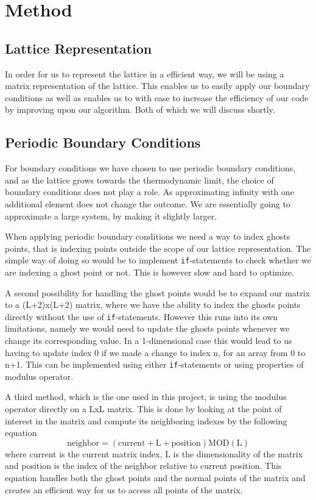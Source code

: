 \documentclass[%
reprint,
nofootinbib,
amsmath,amssymb,
aps,
]{revtex4-1}
\begin{document}
\section{Method}
\subsection{Lattice Representation} %
In order for us to represent the lattice in a efficient way, we will be using a matrix representation of the lattice. This enables us to easily apply our boundary conditions as well as enables us to with ease to increase the efficiency of our code by improving upon our algorithm. Both of which we will discuss shortly. 
\subsection{Periodic Boundary Conditions} %
For boundary conditions we have chosen to use periodic boundary conditions, and as the lattice grows towards the thermodynamic limit, the choice of boundary conditions does not play a role. As approximating infinity with one additional element does not change the outcome. We are essentially going to approximate a large system, by making it slightly larger. 

When applying periodic boundary conditions we need a way to index ghosts points, that is indexing points outside the scope of our lattice representation. The simple way of doing so would be to implement \texttt{if}-statements to check whether we are indexing a ghost point or not. This is however slow and hard to optimize. 

A second possibility for handling the ghost points would be to expand our matrix to a (L+2)x(L+2) matrix, where we have the ability to index the ghosts points directly without the use of \texttt{if}-statements. However this runs into its own limitations, namely we would need to update the ghosts points whenever we change its corresponding value. In a 1-dimensional case this would lead to us having to update index 0 if we made a change to index n, for an array from 0 to n+1. This can be implemented using either \texttt{if}-statements or using properties of modulus operator. 

A third method, which is the one used in this project, is using the modulus operator directly on a LxL matrix. This is done by looking at the point of interest in the matrix and compute its neighboring indexes by the following equation
\begin{equation}
	\text{neighbor} = (\text{current} + \text{L} + \text{position}) \text{MOD} (\text{L})
\end{equation}
where current is the current matrix index, L is the dimensionality of the matrix and position is the index of the neighbor relative to current position. 
This equation handles both the ghost points and the normal points of the matrix and creates an efficient way for us to access all points of the matrix. 
\end{document}
